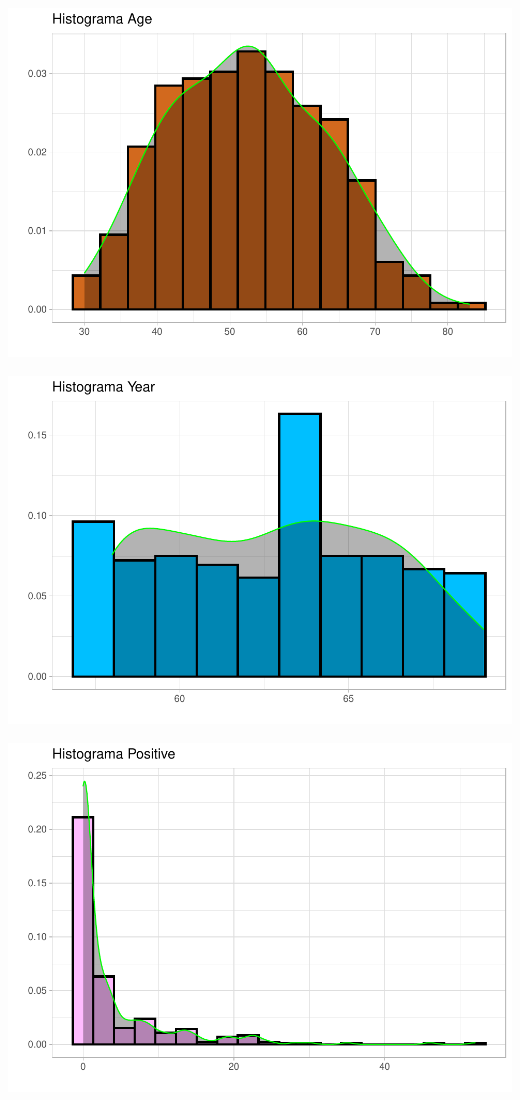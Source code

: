 \documentclass[
]{article}
\begin{document}
\begin{center}\includegraphics{EDA2_files/figure-latex/unnamed-chunk-10-1} \end{center}

\begin{center}\includegraphics{EDA2_files/figure-latex/unnamed-chunk-10-2} \end{center}

\begin{center}\includegraphics{EDA2_files/figure-latex/unnamed-chunk-10-3} \end{center}
\end{document}
